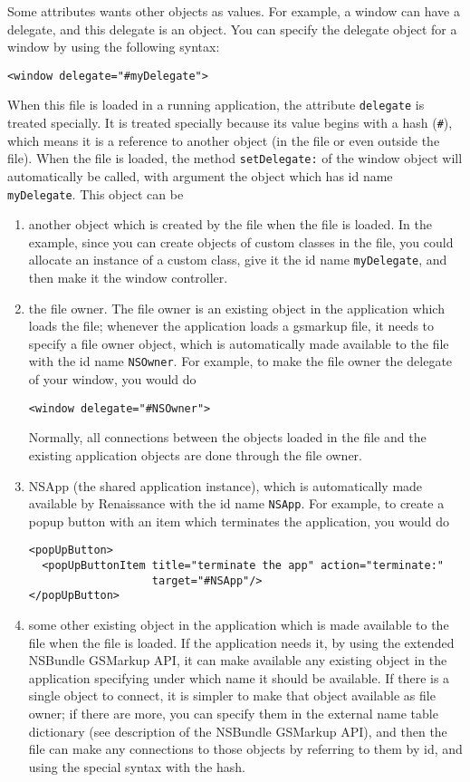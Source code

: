 Some attributes wants other objects as values.  For example, a window
can have a delegate, and this delegate is an object.  You can specify
the delegate object for a window by using the following syntax:
\begin{verbatim}
<window delegate="#myDelegate">
\end{verbatim}
When this file is loaded in a running application, the attribute 
\texttt{delegate} is treated specially.  It is treated specially because
its value begins with a hash (\texttt{\#}), which means it is a
reference to another object (in the file or even outside the file).
When the file is loaded, the method \texttt{setDelegate:} of the
window object will automatically be called, with argument the object
which has id name \texttt{myDelegate}.  This object can be 
\begin{enumerate}
\item another object which is created by the file when the file is loaded. 
     In the example, since you can create objects of custom classes in
     the file, you could allocate an instance of a custom class, give
     it the id name \texttt{myDelegate}, and then make it the window
     controller.

\item the file owner.  The file owner is an existing object in the application 
     which loads the file; whenever the application loads a gsmarkup file,
     it needs to specify a file owner object, which is automatically
     made available to the file with the id name \texttt{NSOwner}.
     For example, to make the file owner the delegate of your window,
     you would do
\begin{verbatim}
<window delegate="#NSOwner">
\end{verbatim}
     Normally, all connections between the objects loaded in the file
     and the existing application objects are done through the file
     owner.

\item NSApp (the shared application instance), which is automatically 
     made available by Renaissance with the id name \texttt{NSApp}.
     For example, to create a popup button with an item which
     terminates the application, you would do
\begin{verbatim}
<popUpButton>
  <popUpButtonItem title="terminate the app" action="terminate:"
                   target="#NSApp"/>
</popUpButton>
\end{verbatim}

\item some other existing object in the application which is made available 
     to the file when the file is loaded.  If the application needs
     it, by using the extended NSBundle GSMarkup API, it can make
     available any existing object in the application specifying under
     which name it should be available.  If there is a single object
     to connect, it is simpler to make that object available as file
     owner; if there are more, you can specify them in the external
     name table dictionary (see description of the NSBundle GSMarkup
     API), and then the file can make any connections to those objects
     by referring to them by id, and using the special syntax with the
     hash.


\end{enumerate}
